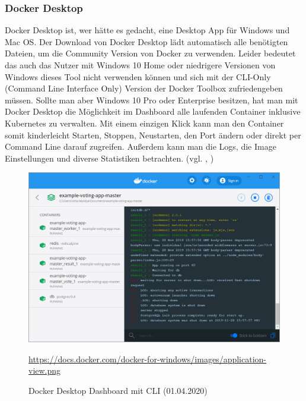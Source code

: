 \subsubsection{Docker Desktop}\label{ssec:DockerDesktop}
Docker Desktop ist, wer hätte es gedacht, eine Desktop App für Windows und Mac OS. Der Download von Docker Desktop lädt automatisch alle benötigten Dateien, um die Community Version von Docker zu verwenden. Leider bedeutet das auch das Nutzer mit Windows 10 Home oder niedrigere Versionen von Windows dieses Tool nicht verwenden können und sich mit der CLI-Only (Command Line Interface Only) Version der Docker Toolbox zufriedengeben müssen. Sollte man aber Windows 10 Pro oder Enterprise besitzen, hat man mit Docker Desktop die Möglichkeit im Dashboard alle laufenden Container inklusive Kubernetes zu verwalten. Mit einem einzigen Klick kann man den Container somit kinderleicht Starten, Stoppen, Neustarten, den Port ändern oder direkt per Command Line darauf zugreifen. Außerdem kann man die Logs, die Image Einstellungen und diverse Statistiken betrachten. (vgl. \cite{DockerDesktopDashboard}, \cite{DockerDesktop}) 
\begin{figure}[H]
    \includegraphics[scale=.65]{images/docker-desktop-view1.png}
    \caption{Docker Desktop Dashboard mit CLI (01.04.2020)}
    \url{https://docs.docker.com/docker-for-windows/images/application-view.png}
    \label{img:docker-desktop-view1}
\end{figure}
